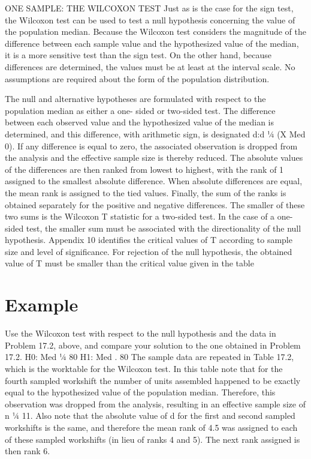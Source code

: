 ONE SAMPLE: THE WILCOXON TEST
Just as is the case for the sign test, the Wilcoxon test can be used to test a null hypothesis concerning the
value of the population median. Because the Wilcoxon test considers the magnitude of the difference between
each sample value and the hypothesized value of the median, it is a more sensitive test than the sign test. On the
other hand, because differences are determined, the values must be at least at the interval scale. No assumptions
are required about the form of the population distribution.

The null and alternative hypotheses are formulated with respect to the population median as either a one-
sided or two-sided test. The difference between each observed value and the hypothesized value of the median
is determined, and this difference, with arithmetic sign, is designated d:d ¼ (X  Med 0). If any difference is
equal to zero, the associated observation is dropped from the analysis and the effective sample size is thereby
reduced. The absolute values of the differences are then ranked from lowest to highest, with the rank of 1
assigned to the smallest absolute difference. When absolute differences are equal, the mean rank is assigned to
the tied values. Finally, the sum of the ranks is obtained separately for the positive and negative differences. 
The
smaller of these two sums is the Wilcoxon T statistic for a two-sided test. In the case of a one-sided test, the
smaller sum must be associated with the directionality of the null hypothesis. Appendix 10 identifies the critical
values of T according to sample size and level of significance. For rejection of the null hypothesis, the obtained
value of T must be smaller than the critical value given in the table

\section*{Example}
Use the Wilcoxon test with respect to the null hypothesis and the data in Problem 17.2, above, and
compare your solution to the one obtained in Problem 17.2.
H0: Med ¼ 80
H1: Med . 80
The sample data are repeated in Table 17.2, which is the worktable for the Wilcoxon test. In this
table note that for the fourth sampled workshift the number of units assembled happened to be
exactly equal to the hypothesized value of the population median. Therefore, this observation was
dropped from the analysis, resulting in an effective sample size of n ¼ 11. Also note that the absolute
value of d for the first and second sampled workshifts is the same, and therefore the mean rank of 4.5
was assigned to each of these sampled workshifts (in lieu of ranks 4 and 5). The next rank assigned is
then rank 6.
